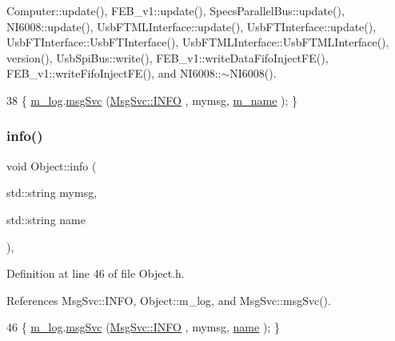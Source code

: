 Computer\+::update(), F\+E\+B\+\_\+v1\+::update(), Specs\+Parallel\+Bus\+::update(), N\+I6008\+::update(), Usb\+F\+T\+M\+L\+Interface\+::update(), Usb\+F\+T\+Interface\+::update(), Usb\+F\+T\+Interface\+::\+Usb\+F\+T\+Interface(), Usb\+F\+T\+M\+L\+Interface\+::\+Usb\+F\+T\+M\+L\+Interface(), version(), Usb\+Spi\+Bus\+::write(), F\+E\+B\+\_\+v1\+::write\+Data\+Fifo\+Inject\+F\+E(), F\+E\+B\+\_\+v1\+::write\+Fifo\+Inject\+F\+E(), and N\+I6008\+::$\sim$\+N\+I6008().


\begin{DoxyCode}
38 \{ \hyperlink{classObject_a0d269813dd7ac1f24bc143031e2963f2}{m\_log}.\hyperlink{classMsgSvc_ad25f18047920cc59a314e5098259711c}{msgSvc} (\hyperlink{classMsgSvc_ae671eb7301996cd049d2da8a65925926ad2fcf3f3e734fc41ee097cc23670ce51}{MsgSvc::INFO}    , mymsg, \hyperlink{classObject_a8b83c95c705d2c3ba0d081fe1710f48d}{m\_name} ); \}
\end{DoxyCode}
\mbox{\label{classObject_a1ca123253dfd30fc28b156f521dcbdae}} 
\subsubsection{\texorpdfstring{info()}{info()}\hspace{0.1cm}{\footnotesize\ttfamily [2/2]}}
{\footnotesize\ttfamily void Object\+::info (\begin{DoxyParamCaption}\item[{std\+::string}]{mymsg,  }\item[{std\+::string}]{name }\end{DoxyParamCaption})\hspace{0.3cm}{\ttfamily [inline]}, {\ttfamily [inherited]}}



Definition at line 46 of file Object.\+h.



References Msg\+Svc\+::\+I\+N\+FO, Object\+::m\+\_\+log, and Msg\+Svc\+::msg\+Svc().


\begin{DoxyCode}
46 \{ \hyperlink{classObject_a0d269813dd7ac1f24bc143031e2963f2}{m\_log}.\hyperlink{classMsgSvc_ad25f18047920cc59a314e5098259711c}{msgSvc} (\hyperlink{classMsgSvc_ae671eb7301996cd049d2da8a65925926ad2fcf3f3e734fc41ee097cc23670ce51}{MsgSvc::INFO}    , mymsg, \hyperlink{classObject_a300f4c05dd468c7bb8b3c968868443c1}{name} ); \}
\end{DoxyCode}
\mbox{\label{classICECALv3_abf7281fad80b80b70c5b13ce66ba3451}} 
